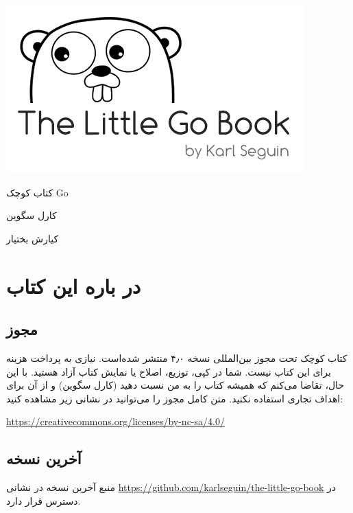 \documentclass{book}
\begin{document}
\thispagestyle{empty}
\begin{titlepage}
 \vspace*{1cm}
 \includegraphics{title}
 
 {\huge\raggedleft کتاب کوچک Go\par}
 \noindent\hrulefill\par
 {\LARGE\raggedright کارل سگوین\par}
 \vfill
 {\small\raggedright کیارش بختیار\par}
 \setcounter{page}{0}
\end{titlepage}
\tableofcontents
\chapter{در باره این کتاب }%
\newpage
\section{مجوز}
کتاب کوچک  تحت مجوز بین‌المللی    نسخه ۴٫۰ منتشر شده‌است. نیازی به پرداخت هزینه برای این کتاب نیست. شما در کپی، توزیع، اصلاح یا نمایش کتاب آزاد هستید. با این حال، تقاضا می‌کنم که همیشه کتاب را به من نسبت دهید (کارل سگوین) و از آن برای اهداف تجاری استفاده نکنید.
متن کامل مجوز را می‌توانید در نشانی زیر مشاهده کنید:

\begin{latin}
\url{https://creativecommons.org/licenses/by-nc-sa/4.0/}
\end{latin}

\newpage
\section{آخرین نسخه}

منبع آخرین نسخه در نشانی \url{https://github.com/karlseguin/the-little-go-book} در دسترس قرار دارد.
\newpage
\end{document}
